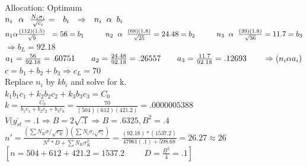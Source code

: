 \documentclass{article}
\begin{document}
\begin{center}
    Allocation: Optimum \\
    $n_i \hspace{.25cm} \alpha \hspace{.25cm} \frac{N_i \sigma_i}{\sqrt{c_i}} = \hspace{.25cm} b_i \hspace{.25cm} \Rightarrow \hspace{.25cm} n_i \hspace{.2cm}\alpha \hspace{.2cm} b_i  $\\
    \smallskip
    $n_1 \alpha \frac{(112)(1.5)}{\sqrt{9}} \hspace{.2cm} = 56 = b_1 \hspace{1cm} n_2 \hspace{.2cm} \alpha \hspace{.2cm} \frac{(68)(1.8)}{\sqrt{25}} = 24.48 = b_2 \hspace{1cm} n_3 \hspace{.2cm} \alpha \hspace{.2cm} \frac{(39)(1.8)}{\sqrt{36}} = 11.7 = b_3 $\\
    \smallskip
    $\Rightarrow b_L = 92.18 $\\ 
    \smallskip
    $a_1 = \frac{56}{92.18} = .60751 \hspace{.7cm} a_2 = \frac{24.48}{92.18} = .26557 \hspace{.7cm} a_3 = \frac{11.7}{92.18} = .12693 \hspace{.7cm} \Rightarrow (n_i \alpha a_i) $ \\
    \smallskip
    $c = b_1 + b_2 + b_3 \Rightarrow c_L = 70 $\\
    \smallskip
    Replace $n_i$ by $kb_i$ and solve for k. \\
    \smallskip
    $k_1 b_1 c_1 + k_2 b_2 c_2 + k_3 b_3 c_3 = C_0 $\\
    \smallskip
    $k = \frac{C_0}{b_1 c_1 + b_2 c_2 + b_3 c_3} = \frac{70}{(504)(612)(421.2)} = .0000005388 $\\ 
    \smallskip
    $V(\bar{y_{st}} = .1 \Rightarrow B = 2\sqrt{.1} \Rightarrow B = .6325, B^2 = .4 $\\ 
    \smallskip
    $n' = \frac{(\sum N_K \sigma/\sqrt{c_K})(\sum N_i \sigma_i \sqrt{c_i})}{N^2 *D + \sum N_K \sigma_K^2} = \frac{(92.18)*(1537.2)}{47961(.1) + 598.68} = 26.27 \approx 26 $\\
    \smallskip
    $[n = 504+612+421.2 =1537.2 \hspace{1cm} D = \frac{B^2}{4} = .1] $\\

\end{center}
\end{document}
